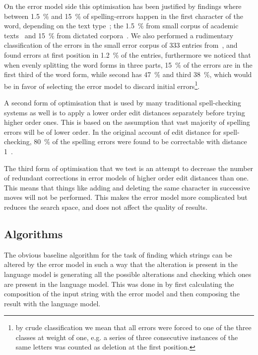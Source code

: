 \documentclass[free]{flammie}
\begin{document}
On the error model side this optimisation has been justified by findings where
between 1.5~\% and 15~\% of spelling-errors happen in the first character of
the word, depending on the text type~\cite{Bhagat/2007};
the 1.5~\% from small corpus of academic texts~\cite{Yannakoudakis/1983}
and 15~\% from dictated corpora~\cite{Kukich/1992}. We also performed a
rudimentary classification of the errors in the small error corpus of
333 entries from~\cite{pirinen/2012/cicling}, and found errors at
first position in 1.2~\% of the entries, furthermore we noticed that
when evenly splitting the word forms in three parts, 15~\% of the errors are
in the first third of the word form, while second has 47~\% and third 38~\%,
which would be in favor of selecting the error model to discard initial
errors\footnote{by crude classification we mean that all errors were
forced to one of the three classes at weight of one, e.g. a series of
three consecutive instances of the same letters was counted as deletion at
the first position.}.

A second form of optimisation that is used by many traditional spell-checking
systems as well is to apply a lower order edit distances separately before
trying higher order ones. This is based on the assumption that vast majority
of spelling errors will be of lower order. In the original
account of edit distance for spell-checking, 80~\% of the spelling
errors were found to be correctable with distance 1~\cite{Pollock/1984}.

The third form of optimisation that we test is an attempt to decrease the
number of redundant corrections in error models of higher order edit distances
than one. This means that things like  adding and deleting the
same character in successive moves will not be performed. This makes the error
model more complicated but reduces the search space, and does not affect the
quality of results.

\subsection{Algorithms}
\label{sec:algorithms}
The obvious baseline algorithm for the task of finding which strings can be
altered by the error model in such a way that the alteration is present in the
language model is generating all the possible alterations and checking which
ones are present in the language model. This was done in \cite{hassan/2008}
by first calculating the composition of the input string with the error
model and then composing the result with the language model.
\end{document}
